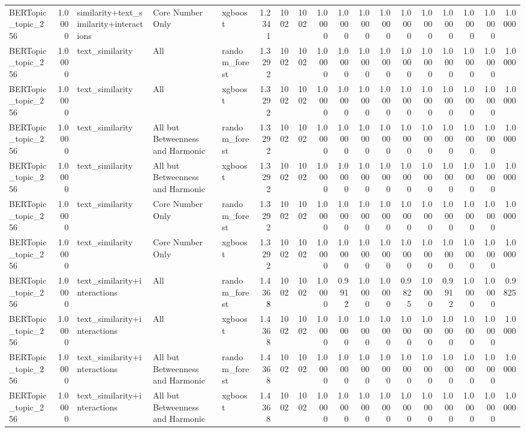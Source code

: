 \begin{tabular}{lrlllrrrrrrrrrrrrr}
BERTopic_topic_256 & 1.0000 & similarity+text_similarity+interactions & Core Number Only & xgboost & 1.2341 & 1002 & 1002 & 1.0000 & 1.0000 & 1.0000 & 1.0000 & 1.0000 & 1.0000 & 1.0000 & 1.0000 & 1.0000 & 1.0000 \\
BERTopic_topic_256 & 1.0000 & text_similarity & All & random_forest & 1.3292 & 1002 & 1002 & 1.0000 & 1.0000 & 1.0000 & 1.0000 & 1.0000 & 1.0000 & 1.0000 & 1.0000 & 1.0000 & 1.0000 \\
BERTopic_topic_256 & 1.0000 & text_similarity & All & xgboost & 1.3292 & 1002 & 1002 & 1.0000 & 1.0000 & 1.0000 & 1.0000 & 1.0000 & 1.0000 & 1.0000 & 1.0000 & 1.0000 & 1.0000 \\
BERTopic_topic_256 & 1.0000 & text_similarity & All but Betweenness and Harmonic & random_forest & 1.3292 & 1002 & 1002 & 1.0000 & 1.0000 & 1.0000 & 1.0000 & 1.0000 & 1.0000 & 1.0000 & 1.0000 & 1.0000 & 1.0000 \\
BERTopic_topic_256 & 1.0000 & text_similarity & All but Betweenness and Harmonic & xgboost & 1.3292 & 1002 & 1002 & 1.0000 & 1.0000 & 1.0000 & 1.0000 & 1.0000 & 1.0000 & 1.0000 & 1.0000 & 1.0000 & 1.0000 \\
BERTopic_topic_256 & 1.0000 & text_similarity & Core Number Only & random_forest & 1.3292 & 1002 & 1002 & 1.0000 & 1.0000 & 1.0000 & 1.0000 & 1.0000 & 1.0000 & 1.0000 & 1.0000 & 1.0000 & 1.0000 \\
BERTopic_topic_256 & 1.0000 & text_similarity & Core Number Only & xgboost & 1.3292 & 1002 & 1002 & 1.0000 & 1.0000 & 1.0000 & 1.0000 & 1.0000 & 1.0000 & 1.0000 & 1.0000 & 1.0000 & 1.0000 \\
BERTopic_topic_256 & 1.0000 & text_similarity+interactions & All & random_forest & 1.4368 & 1002 & 1002 & 1.0000 & 0.9912 & 1.0000 & 1.0000 & 0.9825 & 1.0000 & 0.9912 & 1.0000 & 1.0000 & 0.9825 \\
BERTopic_topic_256 & 1.0000 & text_similarity+interactions & All & xgboost & 1.4368 & 1002 & 1002 & 1.0000 & 1.0000 & 1.0000 & 1.0000 & 1.0000 & 1.0000 & 1.0000 & 1.0000 & 1.0000 & 1.0000 \\
BERTopic_topic_256 & 1.0000 & text_similarity+interactions & All but Betweenness and Harmonic & random_forest & 1.4368 & 1002 & 1002 & 1.0000 & 1.0000 & 1.0000 & 1.0000 & 1.0000 & 1.0000 & 1.0000 & 1.0000 & 1.0000 & 1.0000 \\
BERTopic_topic_256 & 1.0000 & text_similarity+interactions & All but Betweenness and Harmonic & xgboost & 1.4368 & 1002 & 1002 & 1.0000 & 1.0000 & 1.0000 & 1.0000 & 1.0000 & 1.0000 & 1.0000 & 1.0000 & 1.0000 & 1.0000 \\

\end{tabular}
